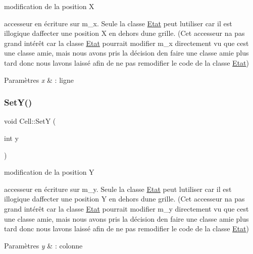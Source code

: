 modification de la position X 

accesseur en écriture sur m\+\_\+x. Seule la classe \mbox{\hyperlink{class_etat}{Etat}} peut l\textquotesingle{}utiliser car il est illogique d\textquotesingle{}affecter une position X en dehors d\textquotesingle{}une grille. (Cet accesseur n\textquotesingle{}a pas grand intérêt car la classe \mbox{\hyperlink{class_etat}{Etat}} pourrait modifier m\+\_\+x directement vu que c\textquotesingle{}est une classe amie, mais nous avons pris la décision d\textquotesingle{}en faire une classe amie plus tard donc nous l\textquotesingle{}avons laissé afin de ne pas remodifier le code de la classe \mbox{\hyperlink{class_etat}{Etat}}) 
\begin{DoxyParams}{Paramètres}
{\em x} & \+: ligne \\
\hline
\end{DoxyParams}
\mbox{\label{class_cell_a48afb0c8c8d1ebe3409b9a166dcd507d}} 
\subsubsection{\texorpdfstring{Set\+Y()}{SetY()}}
{\footnotesize\ttfamily void Cell\+::\+SetY (\begin{DoxyParamCaption}\item[{int}]{y }\end{DoxyParamCaption})\hspace{0.3cm}{\ttfamily [private]}}



modification de la position Y 

accesseur en écriture sur m\+\_\+y. Seule la classe \mbox{\hyperlink{class_etat}{Etat}} peut l\textquotesingle{}utiliser car il est illogique d\textquotesingle{}affecter une position Y en dehors d\textquotesingle{}une grille. (Cet accesseur n\textquotesingle{}a pas grand intérêt car la classe \mbox{\hyperlink{class_etat}{Etat}} pourrait modifier m\+\_\+y directement vu que c\textquotesingle{}est une classe amie, mais nous avons pris la décision d\textquotesingle{}en faire une classe amie plus tard donc nous l\textquotesingle{}avons laissé afin de ne pas remodifier le code de la classe \mbox{\hyperlink{class_etat}{Etat}}) 
\begin{DoxyParams}{Paramètres}
{\em y} & \+: colonne \\
\hline
\end{DoxyParams}


